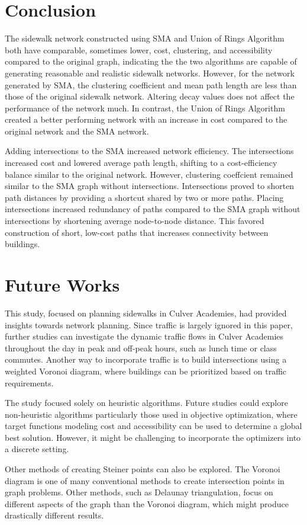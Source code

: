\documentclass[11pt]{article}
\begin{document}
\section{Conclusion}
The sidewalk network constructed using SMA and Union of Rings Algorithm both have comparable, sometimes lower, cost, clustering, and accessibility compared to the original graph, indicating the the two algorithms are capable of generating reasonable and realistic sidewalk networks. However, for the network generated by SMA, the clustering coefficient and mean path length are less than those of the original sidewalk network. Altering decay values does not affect the performance of the network much. In contrast, the Union of Rings Algorithm created a better performing network with an increase in cost compared to the original network and the SMA network. \par
Adding intersections to the SMA increased network efficiency. The intersections increased cost and lowered average path length, shifting to a cost-efficiency balance similar to the original network. However, clustering coeffcient remained similar to the SMA graph without intersections. Intersections proved to shorten path distances by providing a shortcut shared by two or more paths. Placing intersections increased redundancy of paths compared to the SMA graph without intersections by shortening average node-to-node distance. This favored construction of short, low-cost paths that increases connectivity between buildings. 
\section{Future Works}
This study, focused on planning sidewalks in Culver Academies, had provided insights towards network planning. Since traffic is largely ignored in this paper, further studies can investigate the dynamic traffic flows in Culver Academies throughout the day in peak and off-peak hours, such as lunch time or class commutes. Another way to incorporate traffic is to build intersections using a weighted Voronoi diagram, where buildings can be prioritized based on traffic requirements.  \par
The study focused solely on heuristic algorithms. Future studies could explore non-heuristic algorithms particularly those used in objective optimization, where target functions modeling cost and accessibility can be used to determine a global best solution. However, it might be challenging to incorporate the optimizers into a discrete setting. \par
Other methods of creating Steiner points can also be explored. The Voronoi diagram is one of many conventional methods to create intersection points in graph problems. Other methods, such as Delaunay triangulation, focus on different aspects of the graph than the Voronoi diagram, which might produce drastically different results. \par
\end{document}

